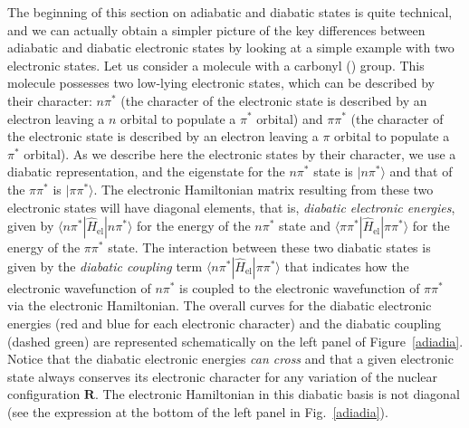 \documentclass[9pt,bestpractices]{livecoms}
\begin{document}
The beginning of this section on adiabatic and diabatic states is quite technical, and we can actually obtain a simpler picture of the key differences between adiabatic and diabatic electronic states by looking at a simple example with two electronic states. Let us consider a molecule with a carbonyl () group. This molecule possesses two low-lying electronic states, which can be described by their character: $n\pi^\ast$ (the character of the electronic state is described by an electron leaving a $n$ orbital to populate a $\pi^\ast$ orbital) and $\pi\pi^\ast$ (the character of the electronic state is described by an electron leaving a $\pi$ orbital to populate a $\pi^\ast$ orbital). As we describe here the electronic states by their character, we use a diabatic representation, and the eigenstate for the $n\pi^\ast$ state is $|n\pi^\ast\rangle$ and that of the $\pi\pi^\ast$ is $|\pi\pi^\ast\rangle$. The electronic Hamiltonian matrix resulting from these two electronic states will have diagonal elements, that is, \textit{diabatic electronic energies}, given by $\langle n\pi^\ast | \hat{H}_{\text{el}} | n\pi^\ast\rangle$ for the energy of the  $n\pi^\ast$ state and $\langle \pi\pi^\ast | \hat{H}_{\text{el}} | \pi\pi^\ast\rangle$ for the energy of the  $\pi\pi^\ast$ state. The interaction between these two diabatic states is given by the \textit{diabatic coupling} term $\langle n\pi^\ast | \hat{H}_{\text{el}} | \pi\pi^\ast\rangle$ that indicates how the electronic wavefunction of $n\pi^\ast$ is coupled to the electronic wavefunction of $\pi\pi^\ast$ via the electronic Hamiltonian. The overall curves for the diabatic electronic energies (red and blue for each electronic character) and the diabatic coupling (dashed green) are represented schematically on the left panel of Figure~\ref{adiadia}. Notice that the diabatic electronic energies \textit{can cross} and that a given electronic state always conserves its electronic character for any variation of the nuclear configuration $\mathbf{R}$. The electronic Hamiltonian in this diabatic basis is not diagonal (see the expression at the bottom of the left panel in Fig.~\ref{adiadia}). 
\end{document}
